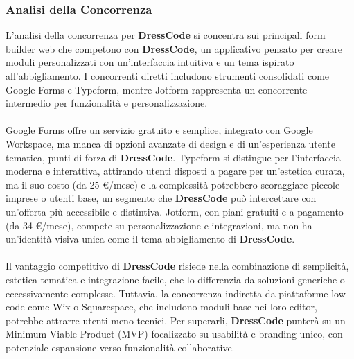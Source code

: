 \subsubsection{Analisi della Concorrenza}
L'analisi della concorrenza per \textbf{DressCode} si concentra sui principali form builder web che competono con \textbf{DressCode}, un applicativo pensato per creare moduli personalizzati con un'interfaccia intuitiva e un tema ispirato all'abbigliamento. I concorrenti diretti includono strumenti consolidati come Google Forms e Typeform, mentre Jotform rappresenta un concorrente intermedio per funzionalità e personalizzazione.
\\\\
Google Forms offre un servizio gratuito e semplice, integrato con Google Workspace, ma manca di opzioni avanzate di design e di un'esperienza utente tematica, punti di forza di \textbf{DressCode}. Typeform si distingue per l'interfaccia moderna e interattiva, attirando utenti disposti a pagare per un'estetica curata, ma il suo costo (da 25 €/mese) e la complessità potrebbero scoraggiare piccole imprese o utenti base, un segmento che \textbf{DressCode} può intercettare con un'offerta più accessibile e distintiva. Jotform, con piani gratuiti e a pagamento (da 34 €/mese), compete su personalizzazione e integrazioni, ma non ha un'identità visiva unica come il tema abbigliamento di \textbf{DressCode}.
\\\\
Il vantaggio competitivo di \textbf{DressCode} risiede nella combinazione di semplicità, estetica tematica e integrazione facile, che lo differenzia da soluzioni generiche o eccessivamente complesse. Tuttavia, la concorrenza indiretta da piattaforme low-code come Wix o Squarespace, che includono moduli base nei loro editor, potrebbe attrarre utenti meno tecnici. Per superarli, \textbf{DressCode} punterà su un Minimum Viable Product (MVP) focalizzato su usabilità e branding unico, con potenziale espansione verso funzionalità collaborative.